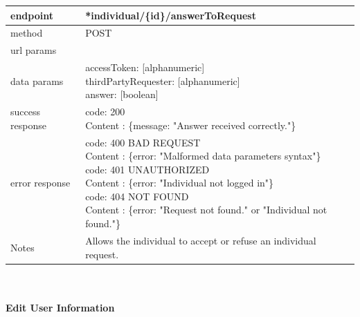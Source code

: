 \begin{legal}
\begin{legal}
\begin{itemize}
								\begin{tabularx}{\linewidth}{| l| l }
									\hline
									endpoint & *individual/\{id\}/answerToRequest \\
									\hline
									method & POST \\
									\hline
									url params & \\
									\hline
									data params &
									\parbox{0.7\textwidth}{
										\bigskip
										accessToken: [alphanumeric]\\
										thirdPartyRequester: [alphanumeric]\\
										answer: [boolean]
										\bigskip
									} \\
									\hline
									success response &
									\parbox{0.7\textwidth}{
										\bigskip
										code: 200\\
										Content : \{message: "Answer received correctly."\}
										\bigskip
									} \\
									\hline
									error response &
									\parbox{0.7\textwidth}{
										\bigskip
										code: 400 BAD REQUEST \\
										Content : \{error: "Malformed data parameters syntax"\}\\
										code: 401 UNAUTHORIZED \\
										Content : \{error: "Individual not logged in"\}\\
										code: 404 NOT FOUND \\
										Content : \{error: "Request not found." or "Individual not found."\}
										\bigskip
									} \\
									\hline
									Notes & 
									\parbox{0.7\textwidth}{
										\bigskip Allows the individual to accept or refuse an individual request.
									\bigskip}  \\
									\hline
								\end{tabularx}\\\\
								
								\textbf{Edit User Information} \\


\end{itemize}
\end{legal}
\end{legal}
